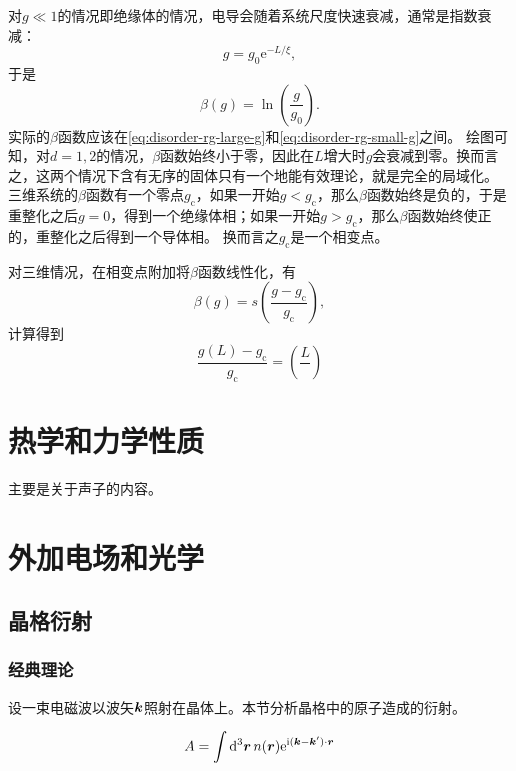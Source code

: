 \documentclass[hyperref, UTF8, a4paper]{ctexart}
\newcommand*{\ii}{\mathrm{i}}
\newcommand*{\ee}{\mathrm{e}}
\begin{document}
对$g \ll 1$的情况即绝缘体的情况，电导会随着系统尺度快速衰减，通常是指数衰减：
\[
    g = g_0 \ee^{- L / \xi},
\]
于是
\begin{equation}
    \beta(g) = \ln(\frac{g}{g_0}).
    \label{eq:disorder-rg-small-g}
\end{equation}
实际的$\beta$函数应该在\eqref{eq:disorder-rg-large-g}和\eqref{eq:disorder-rg-small-g}之间。
绘图可知，对$d=1, 2$的情况，$\beta$函数始终小于零，因此在$L$增大时$g$会衰减到零。换而言之，这两个情况下含有无序的固体只有一个地能有效理论，就是完全的局域化。
三维系统的$\beta$函数有一个零点$g_\text{c}$，如果一开始$g < g_\text{c}$，那么$\beta$函数始终是负的，于是重整化之后$g=0$，得到一个绝缘体相；如果一开始$g > g_\text{c}$，那么$\beta$函数始终使正的，重整化之后得到一个导体相。
换而言之$g_\text{c}$是一个相变点。

对三维情况，在相变点附加将$\beta$函数线性化，有
\begin{equation}
    \beta(g) = s \left( \frac{g - g_\text{c}}{g_\text{c}} \right),
\end{equation}
计算得到
\begin{equation}
    \frac{g(L) - g_\text{c}}{g_\text{c}} = \left( \frac{L}{} \right)
\end{equation}

\section{热学和力学性质}

主要是关于声子的内容。

\section{外加电场和光学}

\subsection{晶格衍射}

\subsubsection{经典理论}

设一束电磁波以波矢$\vb*{k}$照射在晶体上。本节分析晶格中的原子造成的衍射。

\begin{equation}
    A = \int \dd[3]{\vb*{r}} n(\vb*{r}) \ee^{\ii (\vb*{k} - \vb*{k}') \cdot \vb*{r}}
\end{equation}
\end{document}
